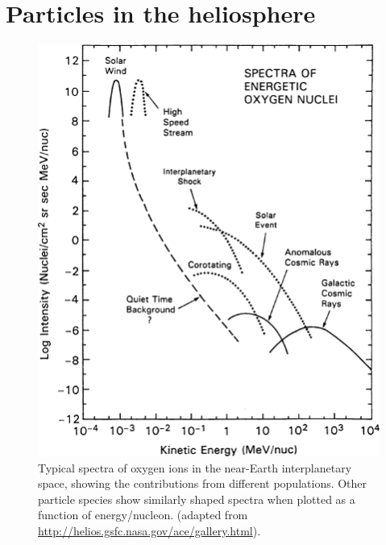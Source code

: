 
\section{Particles in the heliosphere}

\begin{figure}
	\centering
	\includegraphics[width=0.6\linewidth]{images/heliospheric_energy_spectrum}
	\caption{Typical spectra of oxygen ions in the near-Earth interplanetary space, showing the contributions from different populations. Other particle species show similarly shaped spectra when plotted as a function of energy/nucleon. (adapted from \url{http://helios.gsfc.nasa.gov/ace/gallery.html}).}
	\label{fig:heliospheric_energy_spectrum}
\end{figure}